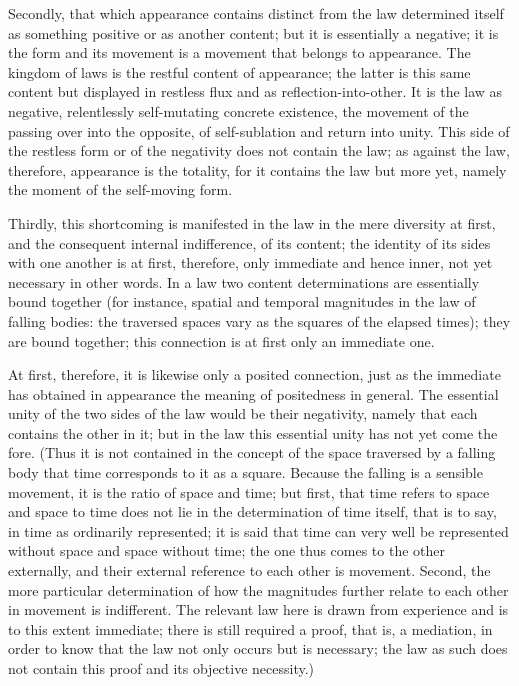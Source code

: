 Secondly, that which appearance contains distinct from the law
determined itself as something positive or as another content;
but it is essentially a negative;
it is the form and its movement is a movement that belongs to appearance.
The kingdom of laws is the restful content of appearance;
the latter is this same content but displayed in restless flux
and as reflection-into-other.
It is the law as negative, relentlessly self-mutating concrete existence,
the movement of the passing over into the opposite,
of self-sublation and return into unity.
This side of the restless form or of the negativity does
not contain the law;
as against the law, therefore, appearance is the totality,
for it contains the law but more yet,
namely the moment of the self-moving form.

Thirdly, this shortcoming is manifested in the law
in the mere diversity at first,
and the consequent internal indifference, of its content;
the identity of its sides with one another is at first, therefore,
only immediate and hence inner, not yet necessary in other words.
In a law two content determinations are essentially bound together
(for instance, spatial and temporal magnitudes in the law of falling bodies:
the traversed spaces vary as the squares of the elapsed times);
they are bound together; this connection is at first only an immediate one.

At first, therefore, it is likewise only a posited connection,
just as the immediate has obtained in appearance
the meaning of positedness in general.
The essential unity of the two sides of the law would be their negativity,
namely that each contains the other in it;
but in the law this essential unity has not yet come the fore.
(Thus it is not contained in the concept of the space traversed by
a falling body that time corresponds to it as a square.
Because the falling is a sensible movement, it is the ratio of space and time;
but first, that time refers to space and space to time
does not lie in the determination of time itself,
that is to say, in time as ordinarily represented;
it is said that time can very well be represented
without space and space without time;
the one thus comes to the other externally,
and their external reference to each other is movement.
Second, the more particular determination of how
the magnitudes further relate to each other in movement is indifferent.
The relevant law here is drawn from experience
and is to this extent immediate;
there is still required a proof, that is, a mediation,
in order to know that the law not only occurs but is necessary;
the law as such does not contain this proof and its objective necessity.)

